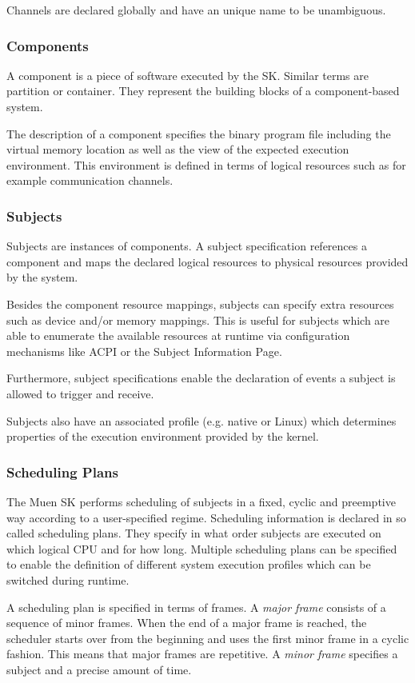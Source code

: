 \documentclass[a4paper,twoside,titlepage]{article}
\begin{document}
Channels are declared globally and have an unique name to be unambiguous.

\subsubsection{Components}
A component is a piece of software executed by the SK. Similar terms are
partition or container. They represent the building blocks of a component-based
system.

The description of a component specifies the binary program file including the
virtual memory location as well as the view of the expected execution
environment. This environment is defined in terms of logical resources such as
for example communication channels.

\subsubsection{Subjects}
Subjects are instances of components. A subject specification references a
component and maps the declared logical resources to physical resources provided
by the system.

Besides the component resource mappings, subjects can specify extra resources
such as device and/or memory mappings. This is useful for subjects which are
able to enumerate the available resources at runtime via configuration
mechanisms like ACPI or the Subject Information Page.

Furthermore, subject specifications enable the declaration of events a subject
is allowed to trigger and receive.

Subjects also have an associated profile (e.g. native or Linux) which determines
properties of the execution environment provided by the kernel.

\subsubsection{Scheduling Plans}
The Muen SK performs scheduling of subjects in a fixed, cyclic and
preemptive way according to a user-specified regime. Scheduling information is
declared in so called scheduling plans. They specify in what order subjects are
executed on which logical CPU and for how long. Multiple scheduling plans can be
specified to enable the definition of different system execution profiles which
can be switched during runtime.

A scheduling plan is specified in terms of frames. A \emph{major frame} consists
of a sequence of minor frames. When the end of a major frame is reached, the
scheduler starts over from the beginning and uses the first minor frame in a
cyclic fashion. This means that major frames are repetitive. A
\emph{minor frame} specifies a subject and a precise amount of time.
\end{document}
